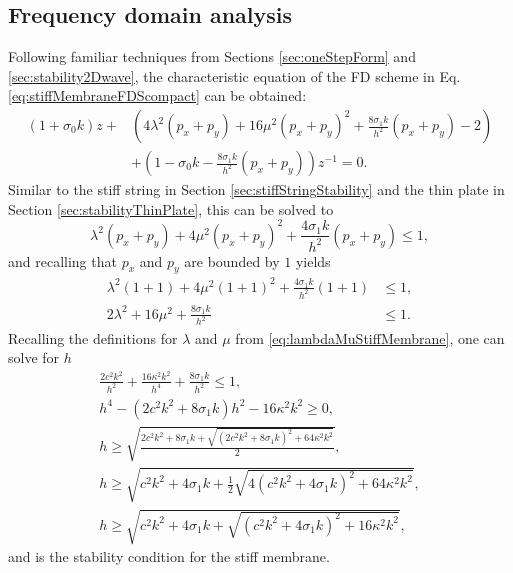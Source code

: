 {\subsection{Frequency domain analysis}\label{sec:stabilityStiffMembrane}
Following familiar techniques from Sections \ref{sec:oneStepForm} and \ref{sec:stability2Dwave}, the characteristic equation of the FD scheme in Eq. \eqref{eq:stiffMembraneFDScompact} can be obtained:
\begin{equation}
    \begin{aligned}
        (1+\sigma_0k)z + &\left(4\lambda^2 (p_x+p_y) + 16\mu^2(p_x+p_y)^2 + \frac{8\sigma_1k}{h^2}(p_x+p_y) - 2\right) \\
        &+ \left(1 - \sigma_0k - \frac{8\sigma_1k}{h^2}(p_x+p_y)\right)z^{-1} = 0.
    \end{aligned}
\end{equation}
Similar to the stiff string in Section \ref{sec:stiffStringStability} and the thin plate in Section \ref{sec:stabilityThinPlate}, this can be solved to 
\begin{equation*}
    \lambda^2(p_x+p_y) + 4\mu^2(p_x+p_y)^2 + \frac{4\sigma_1k}{h^2}(p_x+p_y) \leq 1,
\end{equation*}
and recalling that $p_x$ and $p_y$ are bounded by $1$ yields
\begin{align*}
    \lambda^2(1 + 1) + 4\mu^2(1+1)^2 + \frac{4\sigma_1k}{h^2}(1+1) &\leq 1,\\
    2\lambda^2 + 16\mu^2 + \frac{8\sigma_1k}{h^2} &\leq 1 .
\end{align*}
Recalling the definitions for $\lambda$ and $\mu$ from \ref{eq:lambdaMuStiffMembrane}, one can solve for $h$ 
\begin{gather}
    \frac{2c^2k^2}{h^2}+ \frac{16\kappa^2k^2}{h^4} + \frac{8\sigma_1k}{h^2} \leq 1,\nonumber\\
    h^4 - (2c^2k^2 + 8\sigma_1k)h^2 - 16\kappa^2k^2 \geq 0,\nonumber\\
    h\geq \sqrt{\frac{2c^2k^2 + 8\sigma_1k+\sqrt{(2c^2k^2 + 8\sigma_1k)^2 + 64\kappa^2k^2}}{2}},\nonumber \\
    h\geq \sqrt{c^2k^2 + 4\sigma_1k+\frac{1}{2}\sqrt{4(c^2k^2 + 4\sigma_1k)^2 + 64\kappa^2k^2}},\nonumber\\
    h\geq \sqrt{c^2k^2 + 4\sigma_1k+\sqrt{(c^2k^2 + 4\sigma_1k)^2 + 16\kappa^2k^2}},
\end{gather}
and is the stability condition for the stiff membrane. 
}

